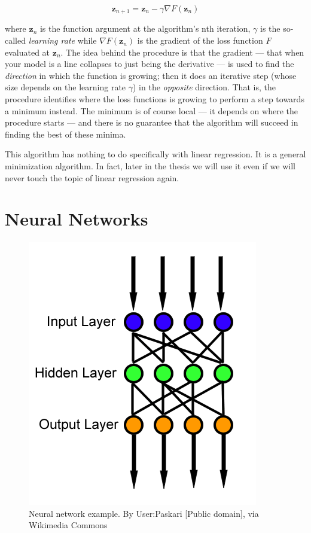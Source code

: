 \begin{equation}
  \boldsymbol{z}_{n+1} = \boldsymbol{z}_n - \gamma
  \nabla{F}(\boldsymbol{z}_n)
\end{equation}

where $\boldsymbol{z}_n$ is the function argument at the algorithm's
nth iteration, $\gamma$ is the so-called \emph{learning rate} while
$\nabla{F}(\boldsymbol{z}_n)$ is the gradient of the loss function $F$
evaluated at $\boldsymbol{z}_n$. The idea behind the procedure is that
the gradient --- that when your model is a line collapses to just
being the derivative --- is used to find the \emph{direction} in which
the function is growing; then it does an iterative step (whose size
depends on the learning rate $\gamma$) in the \emph{opposite}
direction. That is, the procedure identifies where the loss functions
is growing to perform a step towards a minimum instead. The minimum is
of course local --- it depends on where the procedure starts --- and
there is no guarantee that the algorithm will succeed in finding the
best of these minima.

This algorithm has nothing to do specifically with linear regression.
It is a general minimization algorithm. In fact, later in the thesis
we will use it even if we will never touch the topic of linear regression
again.

\section{Neural Networks}
\label{sec:neural-networks}

\begin{figure}
  \centering
  \includegraphics[width=0.5\linewidth]{Images/wikipedia-neural-network.png}
  \caption{Neural network example. By User:Paskari [Public domain], via
    Wikimedia Commons}
  \label{fig:wikipedia-neural-network}
\end{figure}

